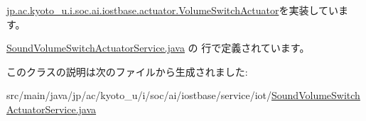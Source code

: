 \hyperlink{interfacejp_1_1ac_1_1kyoto__u_1_1i_1_1soc_1_1ai_1_1iostbase_1_1actuator_1_1_volume_switch_actuator_ab31aa1743348eb4d3cbc2844f9a17ae2}{jp.\-ac.\-kyoto\-\_\-u.\-i.\-soc.\-ai.\-iostbase.\-actuator.\-Volume\-Switch\-Actuator}を実装しています。



 \hyperlink{_sound_volume_switch_actuator_service_8java_source}{Sound\-Volume\-Switch\-Actuator\-Service.\-java} の  行で定義されています。



このクラスの説明は次のファイルから生成されました\-:\begin{DoxyCompactItemize}
\item 
src/main/java/jp/ac/kyoto\-\_\-u/i/soc/ai/iostbase/service/iot/\hyperlink{_sound_volume_switch_actuator_service_8java}{Sound\-Volume\-Switch\-Actuator\-Service.\-java}\end{DoxyCompactItemize}

